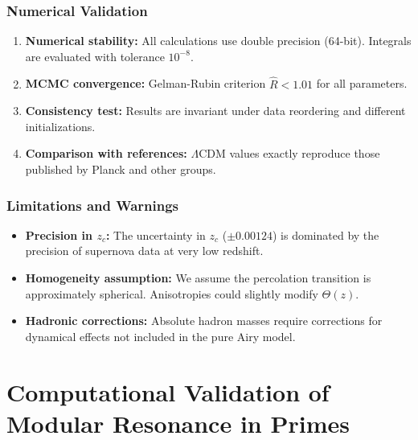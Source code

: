 \documentclass[11pt, a4paper]{article}
\theoremstyle{plain}
\theoremstyle{definition}
\begin{document}
\subsubsection{Numerical Validation}
\begin{enumerate}
    \item \textbf{Numerical stability:} All calculations use double precision (64-bit). Integrals are evaluated with tolerance $10^{-8}$.
    
    \item \textbf{MCMC convergence:} Gelman-Rubin criterion $\hat{R} < 1.01$ for all parameters.
    
    \item \textbf{Consistency test:} Results are invariant under data reordering and different initializations.
    
    \item \textbf{Comparison with references:} $\Lambda$CDM values exactly reproduce those published by Planck and other groups.
\end{enumerate}

\subsubsection{Limitations and Warnings}
\begin{itemize}
    \item \textbf{Precision in $z_c$:} The uncertainty in $z_c$ ($\pm 0.00124$) is dominated by the precision of supernova data at very low redshift.
    
    \item \textbf{Homogeneity assumption:} We assume the percolation transition is approximately spherical. Anisotropies could slightly modify $\Theta(z)$.
    
    \item \textbf{Hadronic corrections:} Absolute hadron masses require corrections for dynamical effects not included in the pure Airy model.
\end{itemize}


\section{Computational Validation of Modular Resonance in Primes}
\label{app:primes_validation}
\end{document}
